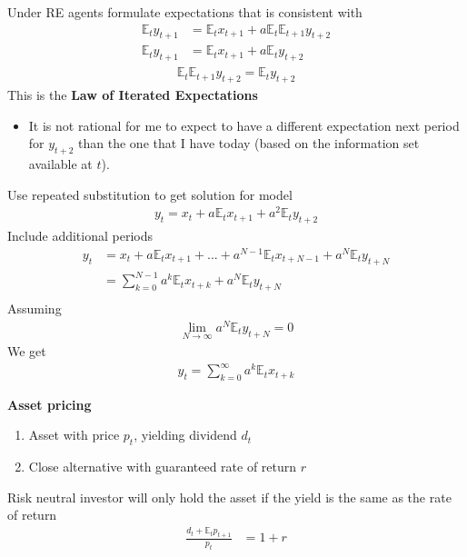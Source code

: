 \documentclass{beamer}
\begin{document}
\begin{frame}
  Under RE agents formulate expectations that is consistent with  
\begin{align}
  \mathbb{E}_ty_{t+1} &= \mathbb{E}_tx_{t+1} + a\mathbb{E}_t\mathbb{E}_{t+1}y_{t+2}\\ \nonumber
  \mathbb{E}_ty_{t+1} &= \mathbb{E}_tx_{t+1} + a\mathbb{E}_ty_{t+2}
\end{align}
\begin{align}
  \mathbb{E}_t\mathbb{E}_{t+1}y_{t+2} = \mathbb{E}_ty_{t+2}
\end{align}
\medskip
This is the \textbf{Law of Iterated Expectations}
\begin{itemize}
  \item It is not rational for me to expect to have a different expectation next period for $y_{t+2}$ than the one that I have today (based on the information set available at $t$).  
\end{itemize}
\end{frame}

\begin{frame}
  Use repeated substitution to get solution for model  
\begin{align}  
    y_t = x_t + a\mathbb{E}_tx_{t+1} + a^2\mathbb{E}_ty_{t+2} 
\end{align}
Include additional periods
\begin{align}
  y_t &= x_t + a\mathbb{E}_tx_{t+1} + ...+ a^{N-1}\mathbb{E}_tx_{t+N-1} +a^{N}\mathbb{E}_ty_{t+N}\\ \nonumber
      &= \sum^{N-1}_{k=0}a^k\mathbb{E}_tx_{t+k} + a^{N}\mathbb{E}_ty_{t+N}\\ \nonumber      
\end{align}
 Assuming
 \begin{align}
   \lim_{N \rightarrow \infty} a^{N}\mathbb{E}_ty_{t+N} = 0
 \end{align}
 We get
 \begin{align}
   y_t=\sum^\infty_{k=0}a^k\mathbb{E}_tx_{t+k}
 \end{align}
\end{frame}

\begin{frame}
  \textbf{Asset pricing}\\
  \begin{enumerate}
    \item Asset with price $p_t$, yielding dividend $d_t$
    \item Close alternative with guaranteed rate of return $r$
  \end{enumerate}
  \medskip  
  Risk neutral investor will only hold the asset if the yield is the same as the rate of return
\begin{align}  
  \frac{d_t + \mathbb{E}_tp_{t+1}}{p_t}&=1+r  
\end{align}
\end{frame}
\end{document}
